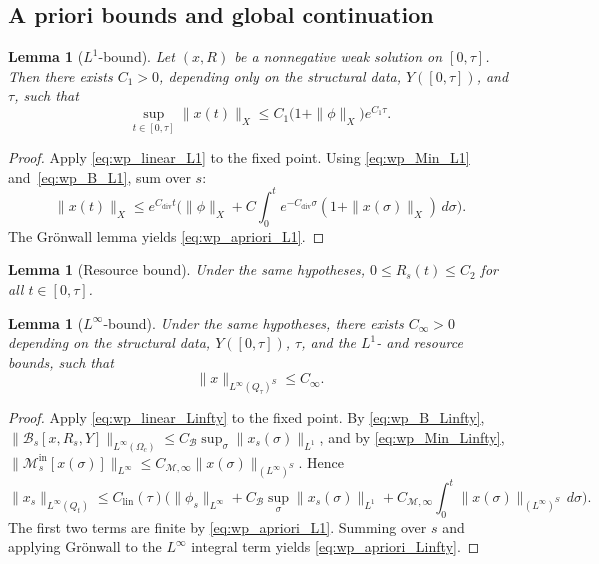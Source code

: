 \documentclass[pdflatex,sn-mathphys-num]{sn-jnl}%
\newtheorem{lemma}[theorem]{Lemma}
\begin{document}
\subsection{A priori bounds and global continuation}
\begin{lemma}[\(L^1\)-bound]\label{lem:wp_L1}
Let \((x,R)\) be a nonnegative weak solution on \([0,\tau]\). Then there exists
\(C_1>0\), depending only on the structural data, \(Y([0,\tau])\), and \(\tau\), such
that
\begin{equation}\label{eq:wp_apriori_L1}
\sup_{t\in[0,\tau]}\|x(t)\|_X
\le
C_1\bigl(1+\|\phi\|_X\bigr)e^{C_1\tau}.
\end{equation}
\end{lemma}
\begin{proof}
Apply \eqref{eq:wp_linear_L1} to the fixed point.
Using \eqref{eq:wp_Min_L1} and~\eqref{eq:wp_B_L1}, sum over \(s\):
\[
\|x(t)\|_X
\le
e^{C_{\mathrm{div}}t}\bigg(
\|\phi\|_X
+C\int_0^t e^{-C_{\mathrm{div}}\sigma}(1+\|x(\sigma)\|_X)\,d\sigma\bigg).
\]
The Gr\"onwall lemma yields \eqref{eq:wp_apriori_L1}.
\end{proof}

\begin{lemma}[Resource bound]\label{lem:wp_Rbound}
Under the same hypotheses, \(0\le R_s(t)\le C_2\) for all \(t\in[0,\tau]\).
\end{lemma}

\begin{lemma}[\(L^\infty\)-bound]\label{lem:wp_Linfty}
Under the same hypotheses, there exists \(C_\infty>0\) depending on the structural data,
\(Y([0,\tau])\), \(\tau\), and the \(L^1\)- and resource bounds, such that
\begin{equation}\label{eq:wp_apriori_Linfty}
\|x\|_{L^\infty(Q_\tau)^S}\le C_\infty.
\end{equation}
\end{lemma}
\begin{proof}
Apply \eqref{eq:wp_linear_Linfty} to the fixed point.
By \eqref{eq:wp_B_Linfty},
\(\|\mathcal B_s[x,R_s,Y]\|_{L^\infty(\Omega_c)}
\le C_{\mathcal B}\sup_\sigma\|x_s(\sigma)\|_{L^1}\),
and by \eqref{eq:wp_Min_Linfty},
\(\|\mathcal M_s^{\mathrm{in}}[x(\sigma)]\|_{L^\infty}
\le C_{\mathcal M,\infty}\|x(\sigma)\|_{(L^\infty)^S}\).
Hence
\[
\|x_s\|_{L^\infty(Q_t)}
\le
C_{\mathrm{lin}}(\tau)\Big(
\|\phi_s\|_{L^\infty}
+C_{\mathcal B}\sup_\sigma\|x_s(\sigma)\|_{L^1}
+C_{\mathcal M,\infty}\int_0^t\|x(\sigma)\|_{(L^\infty)^S}\,d\sigma\Big).
\]
The first two terms are finite by \eqref{eq:wp_apriori_L1}. Summing over \(s\) and
applying Gr\"onwall to the \(L^\infty\) integral term yields
\eqref{eq:wp_apriori_Linfty}.
\end{proof}
\end{document}
